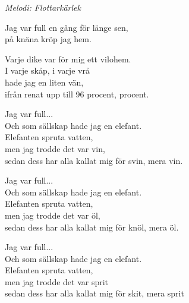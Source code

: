 {\footnotesize\textit{Melodi: Flottarkärlek}}\par
\vspace{10pt}
Jag var full en gång för länge sen,\\
på knäna kröp jag hem.\par
\vspace{10pt}
Varje dike var för mig ett vilohem.\\
I varje skåp, i varje vrå\\
hade jag en liten vän,\\
ifrån renat upp till 96 procent, procent.\par
\vspace{10pt}
Jag var full...\\
Och som sällskap hade jag en elefant.\\
Elefanten spruta vatten,\\
men jag trodde det var vin,\\
sedan dess har alla kallat mig för svin, mera vin.\par
\vspace{10pt}
Jag var full...\\
Och som sällskap hade jag en elefant.\\
Elefanten spruta vatten,\\
men jag trodde det var öl,\\
sedan dess har alla kallat mig för knöl, mera öl.\par
\vspace{10pt}
Jag var full...\\
Och som sällskap hade jag en elefant.\\
Elefanten spruta vatten,\\
men jag trodde det var sprit\\
sedan dess har alla kallat mig för skit, mera sprit
